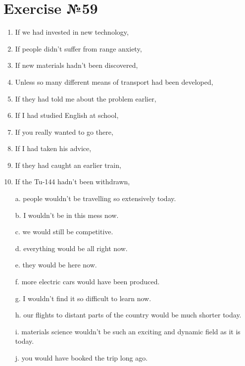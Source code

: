 \section{Exercise №59}
\begin{enumerate}
      \item If we had invested in new technology,
      \item If people didn’t suffer from range anxiety,
      \item If new materials hadn’t been discovered,
      \item Unless so many different means of transport had been developed,
      \item If they had told me about the problem earlier,
      \item If I had studied English at school,
      \item If you really wanted to go there,
      \item If I had taken his advice,
      \item If they had caught an earlier train,
      \item If the Tu-144 hadn’t been withdrawn,
\end{enumerate}

\begin{itemize}
      \item[a.] people wouldn’t be travelling so extensively today.
      \item[b.] I wouldn’t be in this mess now.
      \item[c.] we would still be competitive.
      \item[d.] everything would be all right now.
      \item[e.] they would be here now.
      \item[f.] more electric cars would have been produced.
      \item[g.] I wouldn’t find it so difficult to learn now.
      \item[h.] our flights to distant parts of the country would be much shorter today.
      \item[i.] materials science wouldn’t be such an exciting and dynamic field as it is today.
      \item[j.] you would have booked the trip long ago.
\end{itemize}

